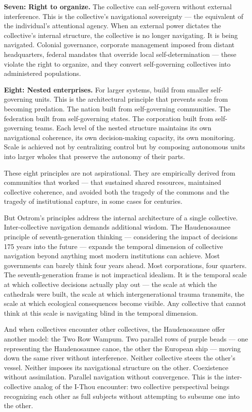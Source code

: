 \textbf{Seven: Right to organize.} The collective can self-govern without external interference. This is the collective's navigational sovereignty — the equivalent of the individual's attentional agency. When an external power dictates the collective's internal structure, the collective is no longer navigating. It is being navigated. Colonial governance, corporate management imposed from distant headquarters, federal mandates that override local self-determination — these violate the right to organize, and they convert self-governing collectives into administered populations.


\textbf{Eight: Nested enterprises.} For larger systems, build from smaller self-governing units. This is the architectural principle that prevents scale from becoming predation. The nation built from self-governing communities. The federation built from self-governing states. The corporation built from self-governing teams. Each level of the nested structure maintains its own navigational coherence, its own decision-making capacity, its own monitoring. Scale is achieved not by centralizing control but by composing autonomous units into larger wholes that preserve the autonomy of their parts.


These eight principles are not aspirational. They are empirically derived from communities that worked — that sustained shared resources, maintained collective coherence, and avoided both the tragedy of the commons and the tragedy of institutional capture, in some cases for centuries.


But Ostrom's principles address the internal architecture of a single collective. Inter-collective navigation demands additional wisdom. The Haudenosaunee principle of seventh-generation thinking — considering the impact of decisions 175 years into the future — expands the temporal dimension of collective navigation beyond anything most modern institutions can achieve. Most governments can barely think four years ahead. Most corporations, four quarters. The seventh-generation frame is not impractical idealism. It is the temporal scale at which collective decisions actually play out — the scale at which the cathedrals were built, the scale at which intergenerational trauma transmits, the scale at which ecological consequences become visible. Any collective that cannot think at this scale is navigating blind in the temporal dimension.


And when collectives encounter other collectives, the Haudenosaunee offer another model: the Two Row Wampum. Two parallel rows of purple beads — one representing the Haudenosaunee canoe, the other the European ship — moving down the same river without interference. Neither collective steers the other's vessel. Neither imposes its navigational structure on the other. Coexistence without assimilation. Parallel navigation without convergence. This is the inter-collective analog of the I-Thou encounter: two collective perspectival beings recognizing each other as full subjects without attempting to subsume one into the other.


